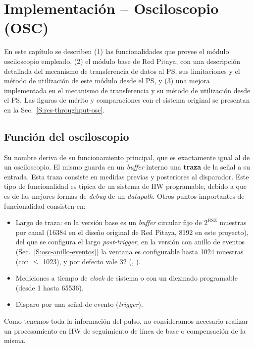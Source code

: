 \chapter{Implementación -- Osciloscopio (OSC)}
\label{C:osc}

\graphicspath{{figs/cap8/}{figs/comunes/}}

\begin{destacado}
En este capítulo se describen (1) las funcionalidades que provee el módulo
osciloscopio empleado, (2) el módulo base de Red Pitaya, con una descripción
detallada del mecanismo de transferencia de datos al PS, sus limitaciones y el
método de utilización de este módulo desde el PS, y (3) una mejora implementada
en el mecanismo de transferencia y su método de utilización desde el PS. Las
figuras de mérito y comparaciones con el sistema original se presentan en la
Sec.~\ref{S:res-throughput-osc}.
\end{destacado}

\section{Función del osciloscopio}
\label{S:osc-funcion}

Su nombre deriva de su funcionamiento principal, que es exactamente igual al de
un osciloscopio. El mismo guarda en un \emph{buffer} interno una \textbf{traza} de la
señal a su entrada. Esta traza consiste en medidas previas y posteriores al
disparador. Este tipo de funcionalidad es típica de un sistema de HW
programable, debido a que es de las mejores formas de \emph{debug} de un \emph{datapath}.
Otros puntos importantes de funcionalidad consisten en:
\begin{itemize}
  \item Largo de traza: en la versión base es un \emph{buffer} circular fijo de
    $2^\text{RSZ}$ muestras por canal (16384 en el diseño original de Red Pitaya,
    8192 en este proyecto), del que se configura el largo \emph{post-trigger}; en la
    versión con anillo de eventos (Sec.~\ref{S:osc-anillo-eventos}) la ventana
     es configurable hasta 1024 muestras (con 
    $\leq$ 1023), y por defecto vale 32 (, ).
  \item Mediciones a tiempo de \emph{clock} de sistema o con un diezmado programable
    (desde 1 hasta 65536).
  \item Disparo por una señal de evento (\emph{trigger}).
\end{itemize}
Como tenemos toda la información del pulso, no consideramos necesario realizar
un procesamiento en HW de seguimiento de línea de base o compensación de la
misma.

